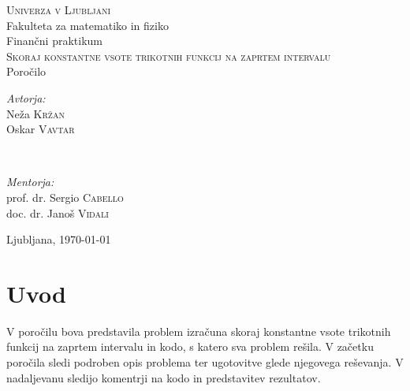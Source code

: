 \documentclass[11pt]{article}
\theoremstyle{definition}
\newcommand{\1}{\mathbbm{1}}
\begin{document}
\begin{titlepage} 

	\center 
	
	\textsc{\LARGE Univerza v Ljubljani}\\[0.5cm] 
	{\Large Fakulteta za matematiko in fiziko}\\[3cm] 
	
	{\large Finančni praktikum}\\[1.0cm]
	
	{\huge \textsc{Skoraj konstantne vsote trikotnih funkcij na zaprtem intervalu}}\\[1.0cm]
	
	{\large Poročilo}\\[3.0cm]
	
	\begin{minipage}{0.4\textwidth}
		\begin{flushleft}
			\large
			\textit{Avtorja:}\\
			Neža \textsc{Kržan} \\
			Oskar \textsc{Vavtar} 
		\end{flushleft}
	\end{minipage}
	~
	\begin{minipage}{0.4\textwidth}
		\begin{flushright}
			\large
			\textit{Mentorja:}\\
			prof. dr. Sergio \textsc{Cabello} \\
			doc. dr. Janoš \textsc{Vidali}
		\end{flushright}
	\end{minipage}
	
	\vfill\vfill\vfill 
	
	{\large{Ljubljana, \today}} 
	 
	\vfill 
	
\end{titlepage}

\tableofcontents
\newpage


\section{Uvod}
\vspace{0.5cm}

V poročilu bova predstavila problem izračuna skoraj konstantne vsote trikotnih funkcij na zaprtem intervalu in kodo, s katero sva problem rešila. 
V začetku poročila sledi podroben opis problema ter ugotovitve glede njegovega reševanja. V nadaljevanu sledijo komentrji na kodo in predstavitev rezultatov.
\end{document}
